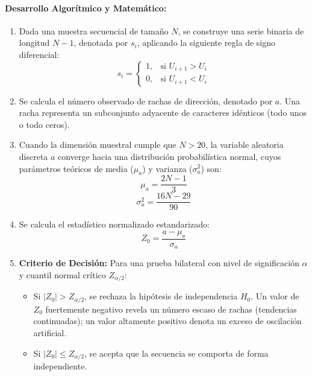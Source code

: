 \documentclass{article}
\begin{document}
\paragraph{Desarrollo Algorítmico y Matemático:}
\begin{enumerate}
    \item Dada una muestra secuencial de tamaño $N$, se construye una serie binaria de longitud $N - 1$, denotada por $s_i$, aplicando la siguiente regla de signo diferencial:
    \begin{equation}
        s_i = \begin{cases} 1, & \text{si } U_{i+1} > U_i \\ 0, & \text{si } U_{i+1} < U_i \end{cases}
    \end{equation}
    \item Se calcula el número observado de rachas de dirección, denotado por $a$. Una racha representa un subconjunto adyacente de caracteres idénticos (todo unos o todo ceros).
    \item Cuando la dimensión muestral cumple que $N > 20$, la variable aleatoria discreta $a$ converge hacia una distribución probabilística normal, cuyos parámetros teóricos de media ($\mu_a$) y varianza ($\sigma_a^2$) son:
    \begin{equation}
        \mu_a = \frac{2N - 1}{3}
    \end{equation}
    \begin{equation}
        \sigma_a^2 = \frac{16N - 29}{90}
    \end{equation}
    \item Se calcula el estadístico normalizado estandarizado:
    \begin{equation}
        Z_0 = \frac{a - \mu_a}{\sigma_a}
    \end{equation}
    \item \textbf{Criterio de Decisión:} Para una prueba bilateral con nivel de significación $\alpha$ y cuantil normal crítico $Z_{\alpha/2}$:
    \begin{itemize}
        \item Si $|Z_0| > Z_{\alpha/2}$, se rechaza la hipótesis de independencia $H_0$. Un valor de $Z_0$ fuertemente negativo revela un número escaso de rachas (tendencias continuadas); un valor altamente positivo denota un exceso de oscilación artificial.
        \item Si $|Z_0| \le Z_{\alpha/2}$, se acepta que la secuencia se comporta de forma independiente.
    \end{itemize}
\end{enumerate}
\end{document}
